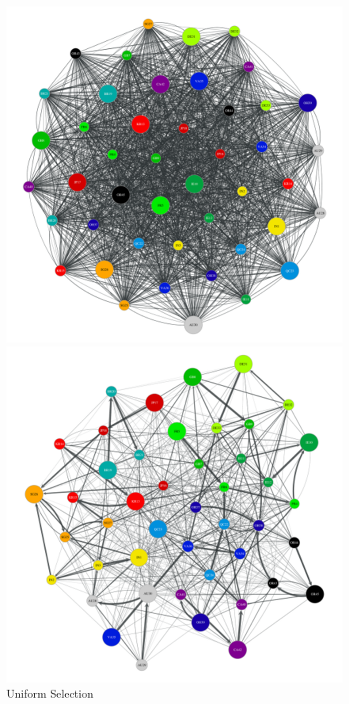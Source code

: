 \begin{figure}[t]
    \centering
      \includegraphics[width=\linewidth]{figures/b-uniform-selection-e1}
      \caption{Uniform Selection}\label{fig:uniform_selection}
    \endminipage\hfill
      \includegraphics[width=\linewidth]{figures/b-annealing-epsilon-greedy-e5}

\end{figure}
